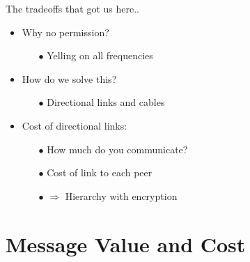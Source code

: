 \documentclass{beamer}
\begin{document}
\begin{frame}{The tradeoffs that got us here..}
\begin{minipage}[t]{0.4\textwidth}
  \end{minipage}%
\begin{minipage}[t]{0.6\textwidth} %
    \small %
    \setlength{\parskip}{6pt} %

\begin{itemize}
    \pause
    \item Why no permission?
    \pause
    \begin{itemize}
        \item[$\bullet$] Yelling on all frequencies
    \end{itemize}

    \pause
    \item How do we solve this?
    \pause
    \begin{itemize}
        \item[$\bullet$] Directional links and cables
    \end{itemize}

    \item Cost of directional links:
    \begin{itemize}
        \item[$\bullet$] How much do you communicate?
        \item[$\bullet$] Cost of link to each peer
        \item[$\bullet$] $\Rightarrow$ Hierarchy with encryption
    \end{itemize}
\end{itemize}

\end{minipage}


\end{frame}



\section{Message Value and Cost}
\end{document}
